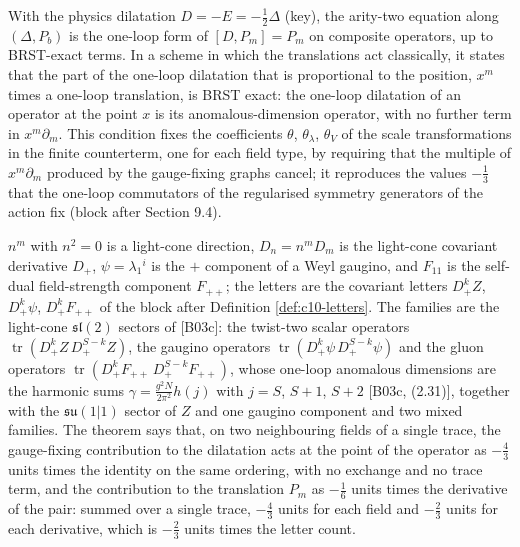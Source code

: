 \begin{remark}
With the physics dilatation $D=-E=-\tfrac12\Delta$ (key), the arity-two equation along $(\Delta,P_b)$ is the one-loop form of $[D,P_m]=P_m$ on composite operators, up to BRST-exact terms. In a scheme in which the translations act classically, it states that the part of the one-loop dilatation that is proportional to the position, $x^m$ times a one-loop translation, is BRST exact: the one-loop dilatation of an operator at the point $x$ is its anomalous-dimension operator, with no further term in $x^m\partial_m$. This condition fixes the coefficients $\theta$, $\theta_\lambda$, $\theta_V$ of the scale transformations in the finite counterterm, one for each field type, by requiring that the multiple of $x^m\partial_m$ produced by the gauge-fixing graphs cancel; it reproduces the values $-\tfrac13$ that the one-loop commutators of the regularised symmetry generators of the action fix (block after Section 9.4).
\end{remark}

\begin{remark}
$n^m$ with $n^2=0$ is a light-cone direction, $D_n=n^mD_m$ is the light-cone covariant derivative $D_+$, $\psi=\lambda_1{}^i$ is the $+$ component of a Weyl gaugino, and $F_{11}$ is the self-dual field-strength component $F_{++}$; the letters are the covariant letters $D_+^kZ$, $D_+^k\psi$, $D_+^kF_{++}$ of the block after Definition \ref{def:c10-letters}. The families are the light-cone $\mathfrak{sl}(2)$ sectors of [B03c]: the twist-two scalar operators $\operatorname{tr}(D_+^kZ\,D_+^{S-k}Z)$, the gaugino operators $\operatorname{tr}(D_+^k\psi\,D_+^{S-k}\psi)$ and the gluon operators $\operatorname{tr}(D_+^kF_{++}\,D_+^{S-k}F_{++})$, whose one-loop anomalous dimensions are the harmonic sums $\gamma=\frac{g^2N}{2\pi^2}h(j)$ with $j=S$, $S+1$, $S+2$ [B03c, (2.31)], together with the $\mathfrak{su}(1|1)$ sector of $Z$ and one gaugino component and two mixed families. The theorem says that, on two neighbouring fields of a single trace, the gauge-fixing contribution to the dilatation acts at the point of the operator as $-\tfrac43$ units times the identity on the same ordering, with no exchange and no trace term, and the contribution to the translation $P_m$ as $-\tfrac16$ units times the derivative of the pair: summed over a single trace, $-\tfrac43$ units for each field and $-\tfrac23$ units for each derivative, which is $-\tfrac23$ units times the letter count.
\end{remark}

